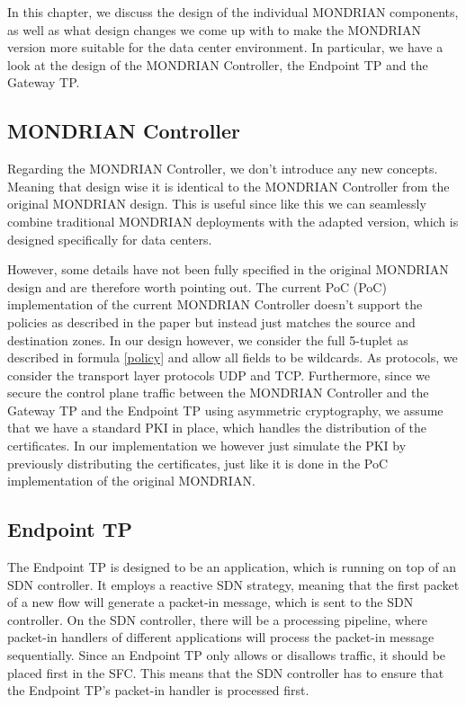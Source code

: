 In this chapter, we discuss the design of the individual MONDRIAN components, as well as what design changes we come up with to make the MONDRIAN version more suitable for the data center environment. In particular, we have a look at the design of the MONDRIAN Controller, the Endpoint \acs{TP} and the Gateway \acs{TP}.


\subsection{MONDRIAN Controller}
Regarding the MONDRIAN Controller, we don't introduce any new concepts. Meaning that design wise it is identical to the MONDRIAN Controller from the original MONDRIAN design. This is useful since like this we can seamlessly combine traditional MONDRIAN deployments with the adapted version, which is designed specifically for data centers.

However, some details have not been fully specified in the original MONDRIAN design and are therefore worth pointing out. The current \acs{PoC} (\acl{PoC}) implementation of the current MONDRIAN Controller doesn't support the policies as described in the paper \cite{kwonmondrian} but instead just matches the source and destination zones. In our design however, we consider the full 5-tuplet as described in formula \ref{policy} and allow all fields to be wildcards. As protocols, we consider the transport layer protocols \acs{UDP} and \acs{TCP}. Furthermore, since we secure the control plane traffic between the MONDRIAN Controller and the Gateway \acs{TP} and the Endpoint \acs{TP} using asymmetric cryptography, we assume that we have a standard \acs{PKI} in place, which handles the distribution of the certificates. In our implementation we however just simulate the \acs{PKI} by previously distributing the certificates, just like it is done in the \acs{PoC} implementation of the original MONDRIAN.

\subsection{Endpoint TP}
The Endpoint \acs{TP} is designed to be an application, which is running on top of an \acs{SDN} controller. It employs a reactive \acs{SDN} strategy, meaning that the first packet of a new flow will generate a packet-in message, which is sent to the \acs{SDN} controller. On the \acs{SDN} controller, there will be a processing pipeline, where packet-in handlers of different applications will process the packet-in message sequentially. Since an Endpoint \acs{TP} only allows or disallows traffic, it should be placed first in the \acs{SFC}. This means that the \acs{SDN} controller has to ensure that the Endpoint \acs{TP}'s packet-in handler is processed first. 

